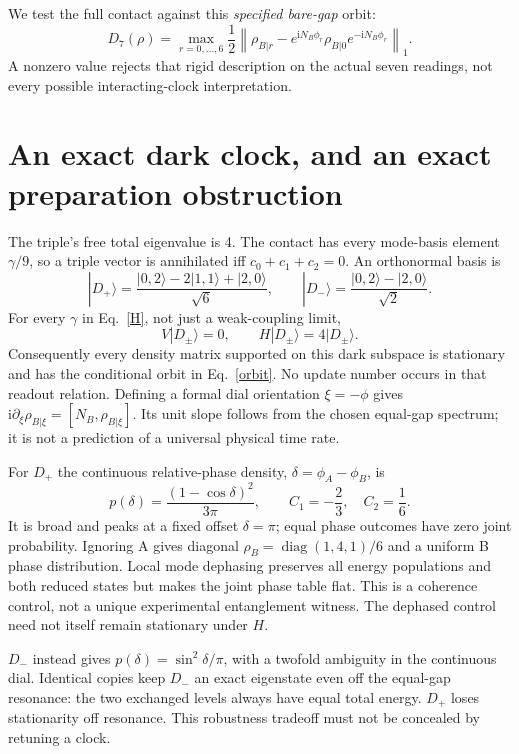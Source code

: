 \documentclass[11pt,a4paper]{article}
\newcommand{\ii}{\mathrm i}
\newcommand{\ket}[1]{|#1\rangle}
\begin{document}
We test the full contact against this \emph{specified bare-gap} orbit:
\begin{equation}
 D_7(\rho)=\max_{r=0,\ldots,6}\frac12
 \left\|\rho_{B|r}-e^{\ii N_B\phi_r}\rho_{B|0}e^{-\ii N_B\phi_r}\right\|_1.
 \label{D7}
\end{equation}
A nonzero value rejects that rigid description on the actual seven
readings, not every possible interacting-clock interpretation.

\newpage
\section{An exact dark clock, and an exact preparation obstruction}
The triple's free total eigenvalue is 4. The contact has every
mode-basis element $\gamma/9$, so a triple vector is annihilated iff
$c_0+c_1+c_2=0$. An orthonormal basis is
\begin{equation}
 \ket{D_+}=\frac{\ket{0,2}-2\ket{1,1}+\ket{2,0}}{\sqrt6},\qquad
 \ket{D_-}=\frac{\ket{0,2}-\ket{2,0}}{\sqrt2}.\label{dark}
\end{equation}
For every $\gamma$ in Eq.~\eqref{H}, not just a weak-coupling limit,
\begin{equation}
 V\ket{D_\pm}=0,\qquad H\ket{D_\pm}=4\ket{D_\pm}.
\end{equation}
Consequently every density matrix supported on this dark subspace is
stationary and has the conditional orbit in Eq.~\eqref{orbit}.
No update number occurs in that readout relation. Defining a formal
dial orientation $\xi=-\phi$ gives
$\ii\partial_\xi\rho_{B|\xi}=[N_B,\rho_{B|\xi}]$.
Its unit slope follows from the chosen equal-gap spectrum; it is not
a prediction of a universal physical time rate.

For $D_+$ the continuous relative-phase density, $\delta=\phi_A-\phi_B$, is
\begin{equation}
 p(\delta)=\frac{(1-\cos\delta)^2}{3\pi},\qquad
 C_1=-\frac23,\quad C_2=\frac16.\label{darkread}
\end{equation}
It is broad and peaks at a fixed offset $\delta=\pi$; equal phase
outcomes have zero joint probability. Ignoring A gives diagonal
$\rho_B=\operatorname{diag}(1,4,1)/6$ and a uniform B phase distribution.
Local mode dephasing preserves all energy populations and both reduced
states but makes the joint phase table flat. This is a coherence
control, not a unique experimental entanglement witness. The dephased
control need not itself remain stationary under $H$.

$D_-$ instead gives $p(\delta)=\sin^2\delta/\pi$, with a twofold
ambiguity in the continuous dial. Identical copies keep $D_-$ an exact
eigenstate even off the equal-gap resonance: the two exchanged levels
always have equal total energy. $D_+$ loses stationarity off resonance.
This robustness tradeoff must not be concealed by retuning a clock.
\end{document}
